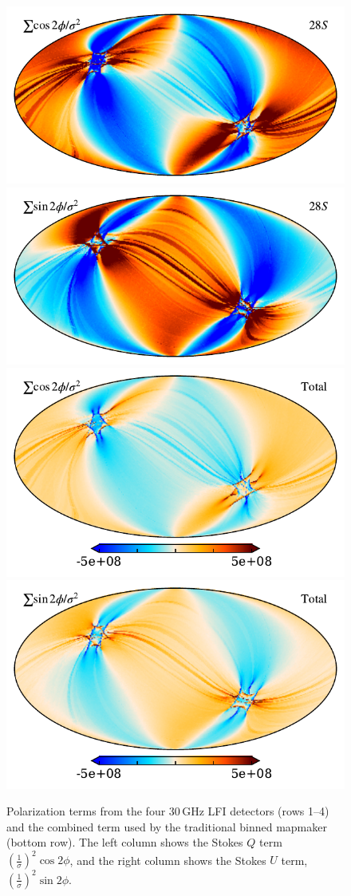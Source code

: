 \documentclass{aa}
\begin{document}
\begin{figure}[t]
  \includegraphics[width=0.47\linewidth]{figs/map_Q_polang28S.pdf}
  \includegraphics[width=0.47\linewidth]{figs/map_U_polang28S.pdf}\\
  \includegraphics[width=0.47\linewidth]{figs/map_Q_polang_all.pdf}
  \includegraphics[width=0.47\linewidth]{figs/map_U_polang_all.pdf}\\
  \caption{Polarization terms from the four 30\,GHz LFI detectors (rows 1--4) and the combined term used by the traditional binned mapmaker (bottom row). The left column shows the Stokes $Q$ term $(\frac{1}{\sigma})^2 \cos2\phi$, and the right column shows the Stokes $U$ term, $(\frac{1}{\sigma})^2 \sin2\phi$.}
  \label{fig:polangles}
\end{figure}



\end{document}
